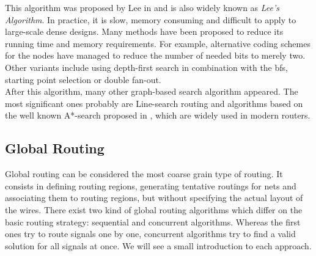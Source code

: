 This algorithm was proposed by Lee in \cite{lee} and is also widely known as \textit{Lee's Algorithm}. In practice, it is slow, memory consuming and difficult to apply to large-scale dense designs. Many methods have been proposed to reduce its running time and memory requirements. For example, alternative coding schemes for the nodes have managed to reduce the number of needed bits to merely two. Other variants include using depth-first search in combination with the \gls{bfs}, starting point selection or double fan-out. \\

After this algorithm, many other graph-based search algorithm appeared. The most significant ones probably are Line-search routing \cite{linesearch} and algorithms based on the well known A*-search proposed in \cite{astrella}, which are widely used in modern routers.

\subsection{Global Routing}
Global routing can be considered the most coarse grain type of routing. It consists in defining routing regions, generating tentative routings for nets and associating them to routing regions, but without specifying the actual layout of the wires. There exist two kind of global routing algorithms which differ on the basic routing strategy: sequential and concurrent algorithms. Whereas the first ones try to route signals one by one, concurrent algorithms try to find a valid solution for all signals at once. We will see a small introduction to each approach.

